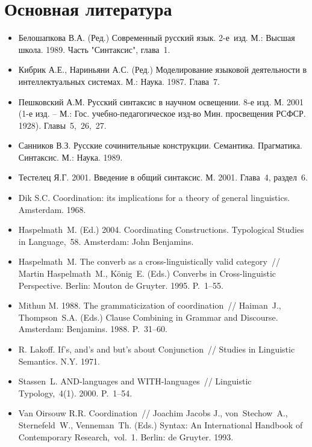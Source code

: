 \hypertarget{ux43eux441ux43dux43eux432ux43dux430ux44f-ux43bux438ux442ux435ux440ux430ux442ux443ux440ux430}{%
\section{Основная
литература}\label{ux43eux441ux43dux43eux432ux43dux430ux44f-ux43bux438ux442ux435ux440ux430ux442ux443ux440ux430}}

\begin{itemize}
\item
  Белошапкова В.А. (Ред.) Современный русский язык. 2-е~изд. М.: Высшая
  школа. 1989. Часть "Синтаксис", глава~1.
\item
  Кибрик А.Е., Нариньяни А.С. (Ред.) Моделирование языковой деятельности
  в интеллектуальных системах. М.: Наука. 1987. Глава~7.
\item
  Пешковский А.М. Русский синтаксис в научном освещении. 8-е изд. М.
  2001 (1-е изд. -- М.: Гос. учебно-педагогическое изд-во Мин.
  просвещения РСФСР. 1928). Главы~5,~26,~27.
\item
  Санников В.З. Русские сочинительные конструкции. Семантика.
  Прагматика. Синтаксис. М.: Наука. 1989.
\item
  Тестелец Я.Г. 2001. Введение в общий синтаксис. М. 2001. Глава~4,
  раздел~6.
\item
  Dik S.C. Coordination: its implications for a theory of general
  linguistics. Amsterdam. 1968.
\item
  Haspelmath~M. (Ed.) 2004. Coordinating Constructions. Typological
  Studies in Language,~58. Amsterdam: John Benjamins.
\item
  Haspelmath~M. The converb as a cross-linguistically valid category~//
  Martin Haspelmath~M., König~E. (Eds.) Converbs in Cross-linguistic
  Perspective. Berlin: Mouton de Gruyter. 1995. P.~1--55.
\item
  Mithun M. 1988. The grammaticization of coordination~// Haiman~J.,
  Thompson~S.A. (Eds.) Clause Combining in Grammar and Discourse.
  Amsterdam: Benjamins. 1988. P.~31--60.
\item
  R. Lakoff. If's, and's and but's about Conjunction~// Studies in
  Linguistic Semantics. N.Y. 1971.
\item
  Stassen~L. AND-languages and WITH-languages~// Linguistic
  Typology,~4(1). 2000. P.~1--54.
\item
  Van Oirsouw R.R. Coordination~// Joachim Jacobs J., von~Stechow~A.,
  Sternefeld~W., Venneman~Th. (Eds.) Syntax: An International Handbook
  of Contemporary Research,~vol.~1. Berlin: de Gruyter. 1993.
\end{itemize}
